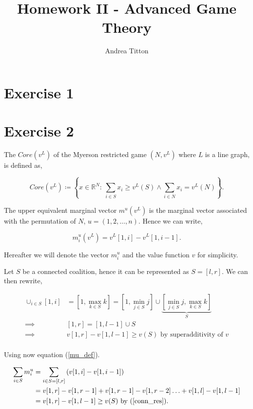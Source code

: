 \documentclass[american]{scrartcl}
\title{Homework II - Advanced Game Theory }
\author{Andrea Titton}
\newcommand{\set}[1]{\left\{#1\right\}}
\newcommand{\Real}{\mathbb{R}}
\begin{document}

\maketitle

\section*{Exercise 1}

\section*{Exercise 2}

The $Core(v^L)$ of the Myerson restricted game $(N, v^L)$ where $L$ is a line graph, is defined as,

\begin{equation}
    Core(v^L) \coloneqq \set{x \in \Real^N: \ \sum_{i \in S} x_i \geq v^L(S) \land \sum_{i \in N} x_i = v^L(N)}.
\end{equation}

The upper equivalent marginal vector $m^u(v^L)$ is the marginal vector associated with the permutation of $N$, $u = (1, 2, \ldots, n)$. Hence we can write,

\begin{equation} \label{mu_def}
    m^u_i(v^L) = v^L[1, i] - v^L[1, i-1].
\end{equation}

Hereafter we will denote the vector $m^u_i$ and the value function $v$ for simplicity.

Let $S$ be a connected coalition, hence it can be represented as $S=[l, r]$. We can then rewrite,

\begin{equation} \label{conn_res}
    \begin{split}
        \cup_{i \in S} [1, i] &= [1, \max_{k \in S} k] = [1, \min_{j \in S}j] \cup \underbrace{[\min_{j \in S}j, \max_{k \in S}k]}_{S}\\
        \implies & [1, r] = [1, l - 1] \cup S \\
        \implies & v[1, r] - v[1, l - 1]  \geq  v(S) \text{ by superadditivity of } v \\
    \end{split}
\end{equation}

Using now equation (\ref{mu_def}).

\begin{equation} \label{incore}
    \begin{split}
        \sum_{i \in S} m^u_i &= \sum_{i \in S = [l, r]} \left(v[1, i] - v[1, i-1]\right) \\
        &= v[1, r] - v[1, r - 1] + v[1, r -1] - v[1,  r - 2] \ldots + v[1, l] - v[1, l-1] \\
        &= v[1, r] - v[1, l - 1] \geq v(S) \text{ by (\ref{conn_res}).}
    \end{split}
\end{equation}
\end{document}
